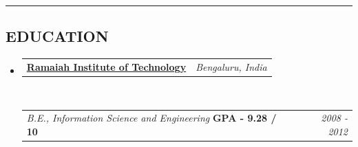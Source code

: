 \documentclass[11pt,letterpaper,hidelinks]{article}
\makeatletter
\newcommand{\headerrow}[2]
{\begin{tabular*}{\linewidth}{l@{\extracolsep{\fill}}r}
	#1 &
	#2 \\
\end{tabular*}}
\makeatother
\begin{document}
\vspace{3pt}



\hrule
\subsection*{\uppercase{Education}}
\vspace{-3pt}
\begin{itemize}
	\parskip=0.1em
    \item 
	\headerrow
		{\href{http://www.msrit.edu/}{\textbf{Ramaiah Institute of Technology}}}
		{\emph{Bengaluru, India}}
	\\
	\headerrow
		{\emph{B.E., Information Science and Engineering} \hspace{20 mm} \textbf{GPA - 9.28 / 10}} 
		{\emph{2008 - 2012}}
\end{itemize}
\vspace{3pt}
\end{document}
